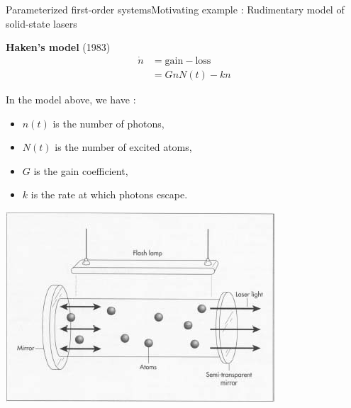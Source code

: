 \documentclass[usenames,dvipsnames,svgnames,10pt,aspectratio=169]{beamer}
\begin{document}
\begin{frame}[t, c]{Parameterized first-order systems}{Motivating example : Rudimentary model of solid-state lasers}
  \begin{minipage}{.58\textwidth}
    \begin{block}{\centering \textbf{Haken's model} (1983)}
      \[
      \begin{aligned}
        \dot{n} & = \text{gain} - \text{loss} \\
        & = GnN(t) - kn
      \end{aligned}
      \]
    \end{block}

    \bigskip

    In the model above, we have :
    \begin{itemize}
    \item $n(t)$ is the number of photons,
    \item $N(t)$ is the number of excited atoms,
    \item $G$ is the gain coefficient,
    \item $k$ is the rate at which photons escape.
    \end{itemize}
  \end{minipage}%
  \hfill
  \begin{minipage}{.38\textwidth}
    \centering
    \includegraphics[width=\textwidth]{laser}
  \end{minipage}

  \vspace{1cm}
\end{frame}
\end{document}
